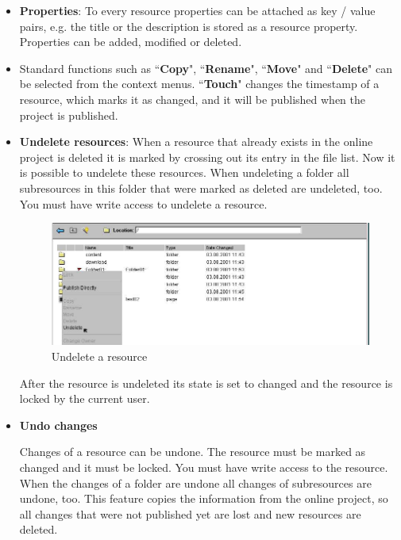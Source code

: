 \begin{itemize}
\item \textbf{Properties}: To every resource properties can be attached as key / value pairs, 
e.g. the title or the description is stored as a resource property.
Properties can be added, modified or deleted.

\item Standard functions such as ``\textbf{Copy}",
``\textbf{Rename}", ``\textbf{Move}" and ``\textbf{Delete}" can be selected from the context
menus. ``\textbf{Touch}" changes the timestamp of a resource, which marks it as changed, 
and it will be published when the project is published.

\item \textbf{Undelete resources}:  When a resource
that already exists in the online project is deleted it is marked
by crossing out its entry in the file list. Now it is possible to
undelete these resources. When undeleting a folder all
subresources in this folder that were marked as deleted are
undeleted, too. You must have write access to undelete a resource.

\begin{figure}[!hbt]
\begin{center}
\includegraphics[width=\sgw]
                   {pics/newProject/undel03}
\caption[Undelete a resource]
           {Undelete a resource}
\label{undel}
\end{center}
\end{figure}

After the resource is undeleted its state is set to changed and
the resource is locked by the current user.


\item \textbf{Undo changes}  

Changes of a resource can be undone. The resource must be
marked as changed and it must be locked. You must have write
access to the resource. When the changes of a folder are undone
all changes of subresources are undone, too. This feature copies
the information from the online project, so all changes that were
not published yet are lost and new resources are deleted.


\end{itemize}
